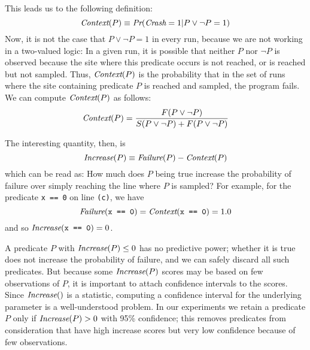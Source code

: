 This leads us to the following definition:
\[
\textit{Context}(P) \equiv \textit{Pr}(\textit{Crash} = 1 | P \lor \lnot P = 1)  
\]
Now, it is not the case that $P \lor \lnot P = 1$ in every run, because we are not working in a two-valued logic:
In a given run, it is possible that neither $P$ nor $\lnot P$ is observed because the site where this predicate occurs is not reached,
or is reached but not sampled.
Thus, $\textit{Context}(P)$ is the probability that
in the set of runs where the site containing predicate $P$ is reached and sampled, the program fails.
We can compute $\textit{Context}(P)$ as follows:
\[ \textit{Context}(P) = \frac{F(P \lor \lnot P)}{S(P \lor \lnot P) + F(P \lor \lnot P)} \]

The interesting quantity, then, is
\begin{equation*}
 \textit{Increase}(P) \equiv \textit{Failure}(P) - \textit{Context}(P) \label{eqn:1}
\end{equation*}
which can be read as: How much does $P$ being true increase the probability of failure
over simply reaching the line where $P$ is sampled?  For example, for the predicate {\tt x == 0} on line {\tt (c)},
we have
\[\textit{Failure}(\mbox{\tt x == 0}) = \textit{Context}(\mbox{\tt x == 0}) = 1.0 \]
and so $\textit{Increase}(\mbox{\tt x == 0}) = 0$.

A predicate $P$ with $\textit{Increase}(P) \leq 0$ has no predictive power; whether it is true does not increase the
probability of failure, and we can safely discard all such predicates.
But because some $\textit{Increase}(P)$ scores may be based on few observations of $P$, it is important
to attach confidence intervals to the scores.  Since $\textit{Increase}()$ is a statistic, computing
a confidence interval for the underlying parameter is a well-understood problem. In our experiments we retain a predicate $P$
only if $\textit{Increase}(P) > 0$ with 95\% confidence; this removes predicates from consideration that have high
increase scores but very low confidence because of few observations. 

